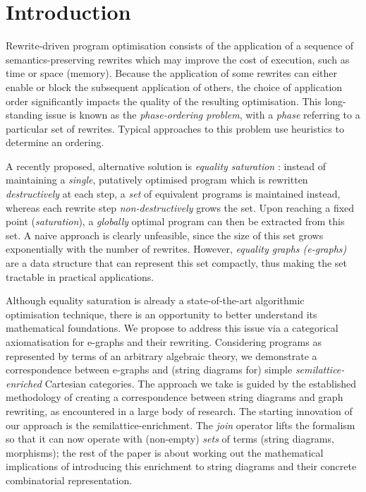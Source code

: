 
\section{Introduction}\label{sec:introduction}


Rewrite-driven program optimisation consists of the application of a sequence of semantics-preserving rewrites which may improve the cost of execution, such as time or space (memory). 
Because the application of some rewrites can either enable or block the subsequent application of others, the choice of application order significantly impacts the quality of the resulting optimisation.  This long-standing issue is known as the \textit{phase-ordering problem}, with a \textit{phase} referring to a particular set of rewrites. Typical approaches to this problem use heuristics to determine an ordering. 

A recently proposed,  alternative solution is \textit{equality saturation} 
\cite{10.1145/1594834.1480915}: instead of maintaining a \textit{single},  putatively optimised program which is rewritten \textit{destructively} at each step, a \textit{set} of equivalent programs is maintained instead, whereas each rewrite step \textit{non-destructively} grows the set.  Upon reaching a fixed point (\textit{saturation}),  a \textit{globally} optimal program can then be extracted from this set.
A naive approach is clearly unfeasible, since the size of this set grows exponentially with the number of rewrites. 
However, \textit{equality graphs (e-graphs)} \cite{EggPaper} are a data structure that can represent this set compactly, thus making the set tractable in practical applications. 

Although equality saturation is already a state-of-the-art algorithmic optimisation technique, there is an opportunity to better understand its mathematical foundations. 
We propose to address this issue via a categorical axiomatisation for e-graphs and their rewriting. 
Considering programs as represented by terms of an arbitrary algebraic theory, we demonstrate a correspondence between e-graphs and (string diagrams for) simple \textit{semilattice-enriched} Cartesian categories. 
The approach we take is guided by the established methodology of creating a correspondence between string diagrams and graph rewriting, as encountered in a large body of research. 
The starting innovation of our approach is the semilattice-enrichment. 
The \textit{join} operator lifts the formalism so that it can now operate with (non-empty) \textit{sets} of terms (string diagrams, morphisms); the rest of the paper is about working out the mathematical implications of introducing this enrichment to string diagrams and their concrete combinatorial representation. 

